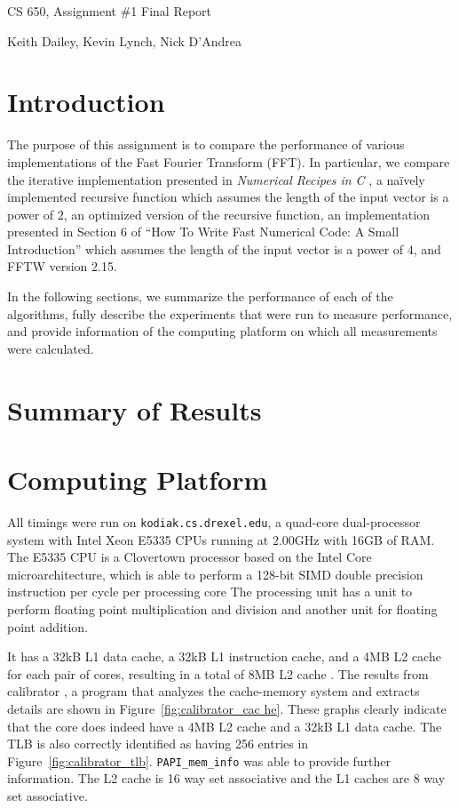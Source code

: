 \documentclass[11 pt]{article}
\author{Keith Dailey}
\title{}
\date{}
\newcommand{\response}{\vspace{.2in}}
\begin{document}
\centerline{\Large{CS 650, Assignment \#1 Final Report}}
\centerline{\large{Keith Dailey, Kevin Lynch, Nick D'Andrea}}

\response

\section{Introduction}

The purpose of this assignment is to compare the performance of various
implementations of the Fast Fourier Transform (FFT).  In particular, we compare
the iterative implementation presented in \emph{Numerical Recipes in C}
\cite{148286}, a na\"{i}vely implemented recursive function which assumes the
length of the input vector is a power of $2$, an optimized version of the
recursive function, an implementation presented in Section 6 of ``How To Write
Fast Numerical Code: A Small Introduction'' \cite{Chellappa:08} which assumes
the length of the input vector is a power of $4$, and FFTW version 2.15.

In the following sections, we summarize the performance of each of the
algorithms, fully describe the experiments that were run to measure
performance, and provide information of the computing platform on which all
measurements were calculated.


\section{Summary of Results}

\section{Computing Platform}
All timings were run on \texttt{kodiak.cs.drexel.edu}, a quad-core
dual-processor system with Intel Xeon E5335 CPUs running at 2.00GHz with 16GB
of RAM. The E5335 CPU is a Clovertown processor based on the Intel Core
microarchitecture, which is able to perform a 128-bit SIMD double precision
instruction per cycle per processing core \cite{intelcore} The processing unit
has a unit to perform floating point multiplication and division and another
unit for floating point addition.

It has a 32kB L1 data cache, a 32kB L1 instruction cache, and a 4MB L2 cache
for each pair of cores, resulting in a total of 8MB L2 cache
\cite{clovertown}. The results from calibrator \cite{calibrator}, a program
that analyzes the cache-memory system and extracts details are shown in
Figure~\ref{fig:calibrator_cac he}. These graphs clearly indicate that the core
does indeed have a 4MB L2 cache and a 32kB L1 data cache. The TLB is also
correctly identified as having 256 entries in
Figure~\ref{fig:calibrator_tlb}. \texttt{PAPI\_mem\_info} \cite{papi} was able
to provide further information. The L2 cache is 16 way set associative and the
L1 caches are 8 way set associative.
\end{document}
